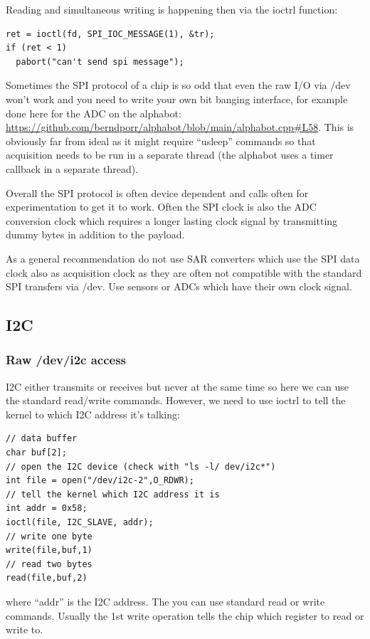 \documentclass[12pt]{report}
\begin{document}
Reading and simultaneous writing is happening then via the ioctrl
function:
\begin{verbatim}
ret = ioctl(fd, SPI_IOC_MESSAGE(1), &tr);
if (ret < 1)
  pabort("can't send spi message");	  
\end{verbatim}

Sometimes the SPI protocol of a chip is so odd that even the raw
I/O via /dev won't work and you need to write your own bit banging
interface, for example done here for the ADC on the alphabot:
\url{https://github.com/berndporr/alphabot/blob/main/alphabot.cpp#L58}.
This is obviously far from ideal as it might require ``usleep'' commands
so that acquisition needs to be run in a separate thread (the alphabot
uses a timer callback in a separate thread).

Overall the SPI protocol is often device dependent and calls often
for experimentation to get it to work. Often the SPI clock is also
the ADC conversion clock which requires a longer lasting clock signal
by transmitting dummy bytes in addition to the payload.

As a general recommendation do not use SAR converters which use the
SPI data clock also as acquisition clock as they are often not compatible
with the standard SPI transfers via /dev. Use sensors or ADCs which
have their own clock signal.


\subsection{I2C}
\subsubsection{Raw /dev/i2c access}
I2C either transmits or receives but never at the same time so here we
can use the standard read/write commands. However, we need to use ioctrl to tell
the kernel to which I2C address it's talking:
\begin{verbatim}
// data buffer
char buf[2];
// open the I2C device (check with "ls -l/ dev/i2c*")
int file = open("/dev/i2c-2",O_RDWR);
// tell the kernel which I2C address it is
int addr = 0x58;
ioctl(file, I2C_SLAVE, addr);
// write one byte
write(file,buf,1)
// read two bytes
read(file,buf,2)
\end{verbatim}
where ``addr'' is the I2C address. The you can use standard read
or write commands. Usually the 1st write operation tells the chip
which register to read or write to.
\end{document}
